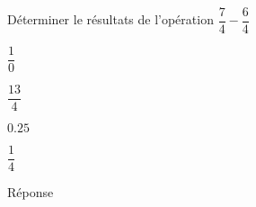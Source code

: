 \begin{exercice}
    Déterminer le résultats de l'opération $\dfrac{7}{4}-\dfrac{6}{4}$
    \begin{ChoixQCM}{4}
        \item $\dfrac{1}{0}$
        \item $\dfrac{13}{4}$
        \item $\num{0.25}$
        \item $\dfrac{1}{4}$
    \end{ChoixQCM}
\end{exercice}
\begin{corrige}
    Réponse  
\end{corrige}